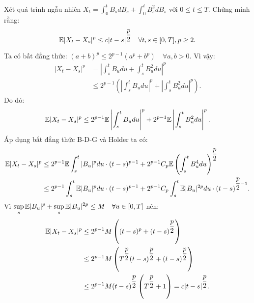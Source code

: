 \begin{exam*}
Xét quá trình ngẫu nhiên $X_t = \displaystyle \int_0^t B_s dB_s + \displaystyle \int_0^t B_s^2 dB_s$ với $0 \leq t \leq T$. Chứng minh rằng:
\[\mathbb{E} |X_t-X_s|^p \leq c |t-s|^{\dfrac{p}{2}}  \quad \forall t,s \in [0,T], p \geq 2.\]
\begin{sol*}
    Ta có bất đẳng thức: $(a+b)^p \leq 2^{p-1}(a^p+b^p) \quad \forall a,b>0$. Vì vậy:
    \begin{align*}
        |X_t-X_s|^p &= \left|\displaystyle \int_s^t B_u du + \displaystyle \int_s^t B_u^2 du \right|^p\\
        &\leq 2^{p-1} \left( \left|\displaystyle \int_s^t B_u du \right|^p+  \left|\displaystyle \int_s^t B_u^2 du \right|^p \right).
    \end{align*}
    Do đó: \[\mathbb{E} |X_t-X_s|^p \leq 2^{p-1} \mathbb{E} \left|\displaystyle \int_s^t B_u du \right|^p + 2^{p-1} \mathbb{E} \left|\displaystyle \int_s^t B_u^2 du \right|^p.\]
    Áp dụng bất đẳng thức B-D-G và Holder ta có:
    \begin{align*}
        \mathbb{E} |X_t-X_s|^p 
        &\leq 2^{p-1} \mathbb{E} \displaystyle \int_s^t |B_u|^p du \cdot (t-s)^{p-1} + 2^{p-1} C_p \mathbb{E} \left(\displaystyle \int_s^t B_u^4 du\right)^{\dfrac{p}{2}}\\
        &\leq 2^{p-1} \displaystyle \int_s^t \mathbb{E}|B_u|^p du \cdot (t-s)^{p-1} + 2^{p-1} C_p \displaystyle \int_s^t \mathbb{E}|B_u|^{2p} du \cdot (t-s)^{\dfrac{p}{2}-1}.
    \end{align*}
    Vì $\displaystyle\sup_s \mathbb{E}|B_u|^p + \displaystyle\sup_s \mathbb{E}|B_u|^{2p} \leq M \quad \forall u \in [0,T]$ nên:
    \begin{align*}
        \mathbb{E} |X_t-X_s|^p &\leq 2^{p-1} M \left((t-s)^p + (t-s)^{\dfrac{p}{2}}\right)\\
        &\leq 2^{p-1} M \left(T^{\dfrac{p}{2}}(t-s)^{\dfrac{p}{2}} + (t-s)^{\dfrac{p}{2}}\right)\\
        &\leq 2^{p-1} M (t-s)^{\dfrac{p}{2}} \left(T^{\dfrac{p}{2}}+1\right) = c |t-s|^{\dfrac{p}{2}}.
    \end{align*}
\end{sol*}
\end{exam*}
